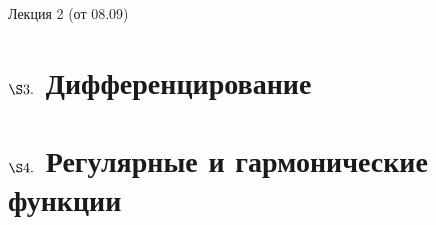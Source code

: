 \LARGE{Лекция 2 (от 08.09)}
\normalsize
\section{$\S 3.$ Дифференцирование}
\section{$\S 4.$ Регулярные и гармонические функции}
